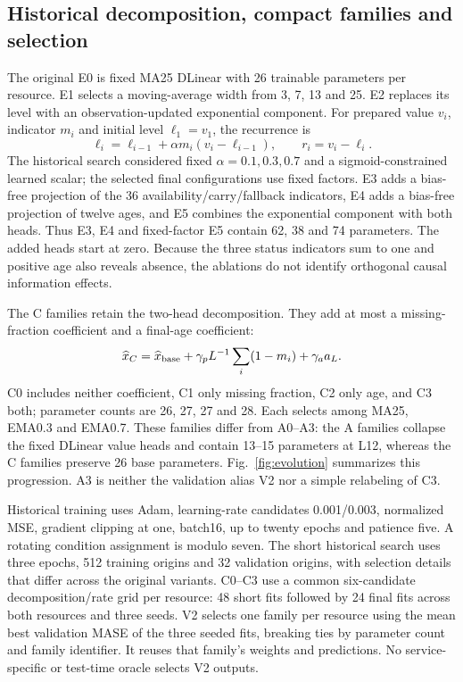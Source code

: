 \subsection{Historical decomposition, compact families and selection}
The original E0 is fixed MA25 DLinear with 26 trainable parameters per resource. E1 selects a moving-average width from 3, 7, 13 and 25. E2 replaces its level with an observation-updated exponential component. For prepared value $v_i$, indicator $m_i$ and initial level $\ell_1=v_1$, the recurrence is
\begin{equation}
\ell_i=\ell_{i-1}+\alpha m_i(v_i-\ell_{i-1}),\qquad r_i=v_i-\ell_i.
\end{equation}
The historical search considered fixed $\alpha=0.1,0.3,0.7$ and a sigmoid-constrained learned scalar; the selected final configurations use fixed factors. E3 adds a bias-free projection of the 36 availability/carry/fallback indicators, E4 adds a bias-free projection of twelve ages, and E5 combines the exponential component with both heads. Thus E3, E4 and fixed-factor E5 contain 62, 38 and 74 parameters. The added heads start at zero. Because the three status indicators sum to one and positive age also reveals absence, the ablations do not identify orthogonal causal information effects.

The C families retain the two-head decomposition. They add at most a missing-fraction coefficient and a final-age coefficient:
\begin{equation}
\widehat x_C=\widehat x_{\rm base}+\gamma_p L^{-1}\sum_i(1-m_i)+\gamma_a a_L.
\end{equation}
C0 includes neither coefficient, C1 only missing fraction, C2 only age, and C3 both; parameter counts are 26, 27, 27 and 28. Each selects among MA25, EMA0.3 and EMA0.7. These families differ from A0--A3: the A families collapse the fixed DLinear value heads and contain 13--15 parameters at L12, whereas the C families preserve 26 base parameters. Fig.~\ref{fig:evolution} summarizes this progression. A3 is neither the validation alias V2 nor a simple relabeling of C3.

Historical training uses Adam, learning-rate candidates 0.001/0.003, normalized MSE, gradient clipping at one, batch16, up to twenty epochs and patience five. A rotating condition assignment is modulo seven. The short historical search uses three epochs, 512 training origins and 32 validation origins, with selection details that differ across the original variants. C0--C3 use a common six-candidate decomposition/rate grid per resource: 48 short fits followed by 24 final fits across both resources and three seeds. V2 selects one family per resource using the mean best validation MASE of the three seeded fits, breaking ties by parameter count and family identifier. It reuses that family's weights and predictions. No service-specific or test-time oracle selects V2 outputs.

